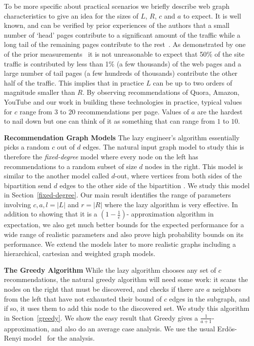 To be more specific about practical scenarios we briefly describe
web graph characteristics to give an idea for the sizes of $L$,
$R$, $c$ and $a$ to expect. It is well known, and can be verified by
prior experiences of the authors that a small number of `head' pages contribute to a
significant amount of the traffic while a long tail of the remaining
pages contribute to the rest~\cite{HubermanAdamic1999, DuDemmerBrewer2006}. As
demonstrated by one of the prior measurements~\cite{KumarNorrisSun2009}
it is not unreasonable to expect that 50\% of the site traffic is
contributed by less than 1\% (a few thousands) of the web pages and a
large number of tail pages (a few hundreds of thousands) contribute
the other half of the traffic. This implies that in practice $L$ can
be up to two orders of magnitude smaller than $R$.  By observing
recommendations of Quora, Amazon, YouTube and our work in building
these technologies in practice, typical values for $c$ range from 3 to
20 recommendations per page. Values of $a$ are the hardest to nail
down but one can think of it as something that can range from $1$ to
$10$.


{\bf Recommendation Graph Models} The lazy engineer's algorithm
essentially picks a random $c$ out of $d$ edges. The natural input graph model to
study this is therefore the {\em
 fixed-degree} model where every
node on the left has recommendations to a random subset of size $d$
nodes in the right. This model is similar to the another model called
$d$-out, where vertices from both sides of the bipartition send $d$
edges to the other side of the bipartition \cite{FriezePittel2004}. We
study this model in Section~\ref{fixed-degree}. Our main result
identifies the range of parameters involving $c,a,l=|L|$ and $r =|R|$
where the lazy algorithm is very effective. In addition to showing
that it is a $(1-\frac1e)$- approximation algorithm in expectation,
we
 also get much better bounds for the expected performance for a
wide
 range of realistic parameters and also prove high probability
bounds
 on its performance. We extend the models later to more
realistic
 graphs including a hierarchical, cartesian and weighted
graph
 models. \vs


{\bf The Greedy Algorithm} While the lazy algorithm chooses any set of $c$ recommendations, the natural
greedy algorithm will need some work: it scans the nodes on the right that must
be discovered, and checks if there are $a$ neighbors from the left that have
not exhausted their bound of $c$ edges in the subgraph, and if so, it uses them to
add this node to the discovered set. We study this algorithm in Section~\ref{greedy}. 
We show the easy result that Greedy gives a $\frac{1}{a+1}$-approximation, 
and also do an average case analysis. We
use the usual Erd\"os-Renyi model~\cite{ErdosRenyi59} for the analysis.

